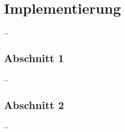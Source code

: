 
\chapter{Implementierung}
\label{ch:Implementierung}
\ldots

\section{Abschnitt 1}
\label{ch:Implementierung:sec:Abschnitt1}

\ldots

\section{Abschnitt 2}
\label{ch:Implementierung:sec:Abschnitt2}

\ldots


